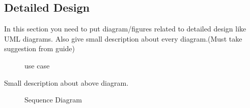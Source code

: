 \subsection{Detailed Design}
\hspace{5mm}In this section you need to put diagram/figures related to detailed design like UML diagrams. Also give small description about every diagram.(Must take suggestion from guide)  
\\
\begin{figure}[h!]
\begin{center}
\end{center}
\caption {use case}
\label{vmb2}
\vspace{0mm}
\end{figure}

\hspace{5mm}Small description about above diagram.

\begin{figure}[h!]
\begin{center}
\end{center}
\caption {Sequence Diagram}
\label{vmb2}
\vspace{0mm}
\end{figure}

